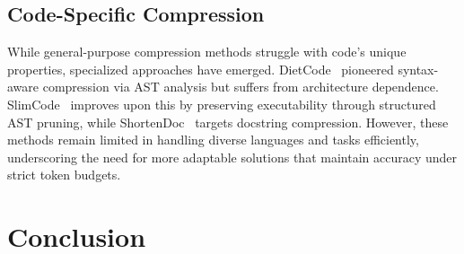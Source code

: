 \subsection{Code-Specific Compression}

While general-purpose compression methods struggle with code's unique properties, specialized approaches have emerged. DietCode~\cite{zhang2022diet} pioneered syntax-aware compression via AST analysis but suffers from architecture dependence. SlimCode~\cite{wang2024naturalbestmodelagnosticcode} improves upon this by preserving executability through structured AST pruning, while ShortenDoc~\cite{yang2024less} targets docstring compression. However, these methods remain limited in handling diverse languages and tasks efficiently, underscoring the need for more adaptable solutions that maintain accuracy under strict token budgets.



\section{Conclusion}

